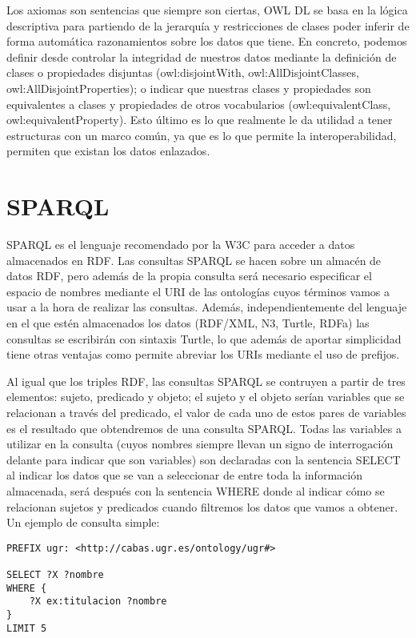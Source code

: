 Los axiomas son sentencias que siempre son ciertas, OWL DL se basa en la lógica descriptiva para partiendo de la jerarquía y restricciones de clases poder inferir de forma automática razonamientos sobre los datos que tiene. En concreto, podemos definir desde controlar la integridad de nuestros datos mediante la definición de clases o propiedades disjuntas (owl:disjointWith, owl:AllDisjointClasses, owl:AllDisjointProperties); o indicar que nuestras clases y propiedades son equivalentes a clases y propiedades de otros vocabularios (owl:equivalentClass, owl:equivalentProperty). Esto último es lo que realmente le da utilidad a tener estructuras con un marco común, ya que es lo que permite la interoperabilidad, permiten que existan los datos enlazados.

\section{SPARQL}

SPARQL es el lenguaje recomendado por la W3C para acceder a datos almacenados en RDF. Las consultas SPARQL se hacen sobre un almacén de datos RDF, pero además de la propia consulta será necesario especificar el espacio de nombres mediante el URI de las ontologías cuyos términos vamos a usar a la hora de realizar las consultas. Además, independientemente del lenguaje en el que estén almacenados los datos (RDF/XML, N3, Turtle, RDFa) las consultas se escribirán con sintaxis Turtle, lo que además de aportar simplicidad tiene otras ventajas como permite abreviar los URIs mediante el uso de prefijos.

\bigskip
Al igual que los triples RDF, las consultas SPARQL se contruyen a partir de tres elementos: sujeto, predicado y objeto; el sujeto y el objeto serían variables que se relacionan a través del predicado, el valor de cada uno de estos pares de variables es el resultado que obtendremos de una consulta SPARQL. Todas las variables a utilizar en la consulta (cuyos nombres siempre llevan un signo de interrogación delante para indicar que son variables) son declaradas con la sentencia SELECT al indicar los datos que se van a seleccionar de entre toda la información almacenada, será después con la sentencia WHERE donde al indicar cómo se relacionan sujetos y predicados cuando filtremos los datos que vamos a obtener. Un ejemplo de consulta simple: 

\begin{verbatim}
PREFIX ugr: <http://cabas.ugr.es/ontology/ugr#>

SELECT ?X ?nombre
WHERE {
    ?X ex:titulacion ?nombre
}
LIMIT 5
\end{verbatim}

